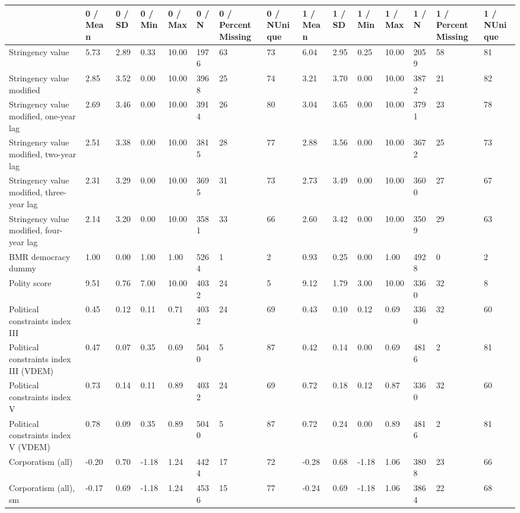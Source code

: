 
\begin{longtable}{lllllllllllllll}
\toprule
  & 0 / Mean & 0 / SD & 0 / Min & 0 / Max & 0 / N & 0 / PercentMissing & 0 / NUnique & 1 / Mean & 1 / SD & 1 / Min & 1 / Max & 1 / N & 1 / PercentMissing & 1 / NUnique\\
\midrule
Stringency value & 5.73 & 2.89 & 0.33 & 10.00 & 1976 & 63 & 73 & 6.04 & 2.95 & 0.25 & 10.00 & 2059 & 58 & 81\\
Stringency value modified & 2.85 & 3.52 & 0.00 & 10.00 & 3968 & 25 & 74 & 3.21 & 3.70 & 0.00 & 10.00 & 3872 & 21 & 82\\
Stringency value modified, one-year lag & 2.69 & 3.46 & 0.00 & 10.00 & 3914 & 26 & 80 & 3.04 & 3.65 & 0.00 & 10.00 & 3791 & 23 & 78\\
Stringency value modified, two-year lag & 2.51 & 3.38 & 0.00 & 10.00 & 3815 & 28 & 77 & 2.88 & 3.56 & 0.00 & 10.00 & 3672 & 25 & 73\\
Stringency value modified, three-year lag & 2.31 & 3.29 & 0.00 & 10.00 & 3695 & 31 & 73 & 2.73 & 3.49 & 0.00 & 10.00 & 3600 & 27 & 67\\
\addlinespace
Stringency value modified, four-year lag & 2.14 & 3.20 & 0.00 & 10.00 & 3581 & 33 & 66 & 2.60 & 3.42 & 0.00 & 10.00 & 3509 & 29 & 63\\
BMR democracy dummy & 1.00 & 0.00 & 1.00 & 1.00 & 5264 & 1 & 2 & 0.93 & 0.25 & 0.00 & 1.00 & 4928 & 0 & 2\\
Polity score & 9.51 & 0.76 & 7.00 & 10.00 & 4032 & 24 & 5 & 9.12 & 1.79 & 3.00 & 10.00 & 3360 & 32 & 8\\
Political constraints index III & 0.45 & 0.12 & 0.11 & 0.71 & 4032 & 24 & 69 & 0.43 & 0.10 & 0.12 & 0.69 & 3360 & 32 & 60\\
Political constraints index III (VDEM) & 0.47 & 0.07 & 0.35 & 0.69 & 5040 & 5 & 87 & 0.42 & 0.14 & 0.00 & 0.69 & 4816 & 2 & 81\\
\addlinespace
Political constraints index V & 0.73 & 0.14 & 0.11 & 0.89 & 4032 & 24 & 69 & 0.72 & 0.18 & 0.12 & 0.87 & 3360 & 32 & 60\\
Political constraints index V (VDEM) & 0.78 & 0.09 & 0.35 & 0.89 & 5040 & 5 & 87 & 0.72 & 0.24 & 0.00 & 0.89 & 4816 & 2 & 81\\
Corporatism (all) & -0.20 & 0.70 & -1.18 & 1.24 & 4424 & 17 & 72 & -0.28 & 0.68 & -1.18 & 1.06 & 3808 & 23 & 66\\
Corporatism (all), sm & -0.17 & 0.69 & -1.18 & 1.24 & 4536 & 15 & 77 & -0.24 & 0.69 & -1.18 & 1.06 & 3864 & 22 & 68\\

\end{longtable}
